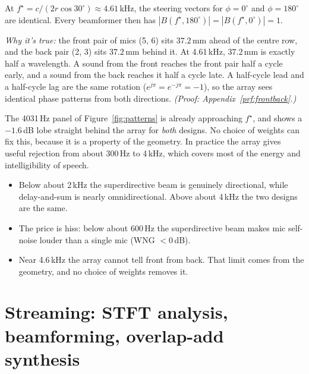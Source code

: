 \documentclass[11pt]{article}
\begin{document}
\begin{proposition}\label{prop:frontback}
At $f^\star=c/(2r\cos30^\circ)\approx4.61$\,kHz, the steering vectors for $\phi=0^\circ$ and
$\phi=180^\circ$ are identical. Every beamformer then has $|B(f^\star,180^\circ)|=|B(f^\star,0^\circ)|=1$.
\end{proposition}
\noindent\emph{Why it's true:} the front pair of mics (5, 6) sits $37.2$\,mm ahead of the centre
row, and the back pair (2, 3) sits $37.2$\,mm behind it. At 4.61\,kHz, $37.2$\,mm is exactly half
a wavelength. A sound from the front reaches the front pair half a cycle early, and a sound
from the back reaches it half a cycle late. A half-cycle lead and a half-cycle lag are the same
rotation ($e^{j\pi}=e^{-j\pi}=-1$), so the array sees identical phase patterns from both
directions.
\emph{(Proof: Appendix~\ref{prf:frontback}.)}

The 4031\,Hz panel of Figure~\ref{fig:patterns} is already approaching $f^\star$, and shows a
$-1.6$\,dB lobe straight behind the array for \emph{both} designs. No choice of weights can fix
this, because it is a property of the geometry. In practice the array gives useful rejection
from about 300\,Hz to 4\,kHz, which covers most of the energy and intelligibility of speech.

\begin{takeaways}
\begin{itemize}[nosep]
\item Below about 2\,kHz the superdirective beam is genuinely directional, while delay-and-sum is
  nearly omnidirectional. Above about 4\,kHz the two designs are the same.
\item The price is hiss: below about 600\,Hz the superdirective beam makes mic self-noise louder
  than a single mic (WNG $<0$\,dB).
\item Near 4.6\,kHz the array cannot tell front from back. That limit comes from the geometry, and
  no choice of weights removes it.
\end{itemize}
\end{takeaways}

\section{Streaming: STFT analysis, beamforming, overlap-add synthesis}\label{sec:stft}
\end{document}
